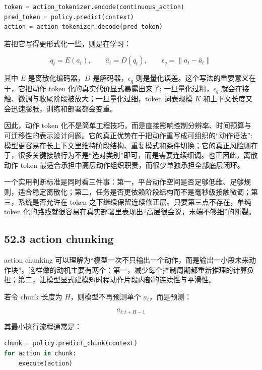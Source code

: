 \begin{lstlisting}[language=python]
token = action_tokenizer.encode(continuous_action)
pred_token = policy.predict(context)
action = action_tokenizer.decode(pred_token)
\end{lstlisting}

若把它写得更形式化一些，则是在学习：

\begingroup
\footnotesize
\begin{equation*}
q_t = E(a_t), \qquad \hat{a}_t = D(q_t), \qquad
\epsilon_q = \|a_t - \hat{a}_t\|
\end{equation*}
\endgroup

其中 \(E\) 是离散化编码器，\(D\) 是解码器，\(\epsilon_q\) 则是量化误差。这个写法的重要意义在于，它把动作 token 化的真实代价显式暴露出来了: 一旦量化过粗，\(\epsilon_q\) 就会在接触、微调与收尾阶段被放大；一旦量化过细，token 词表规模 \(K\) 和上下文长度又会迅速膨胀，训练和部署都会变重。

因此，动作 token 化不是简单工程技巧，而是直接影响控制分辨率、时间预算与可迁移性的表示设计问题。它的真正优势在于把动作重写成可组织的“动作语法”: 模型更容易在长上下文里维持阶段结构、重复模式和条件切换；它的真正风险则在于，很多关键接触行为不是“选对类别”即可，而是需要连续细调。也正因此，离散动作 token 最适合承担中高层动作组织职责，而很少单独承担全部底层闭环。

一个实用判断标准是同时看三件事：第一，平台动作空间是否足够低维、足够规则，适合稳定离散化；第二，任务是否更依赖阶段结构而不是毫秒级接触微调；第三，系统是否允许在 token 之下继续保留连续修正层。只要第三点不存在，单纯 token 化的路线就很容易在真实部署里表现出“高层很会说，末端不够细”的断裂。

\subsection*{52.3 action chunking}


action chunking 可以理解为“模型一次不只输出一个动作，而是输出一小段未来动作块”。这样做的动机主要有两个：第一，减少每个控制周期都重新推理的计算负担；第二，让模型显式建模短时程动作片段内部的连续性与平滑性。

若令 chunk 长度为 \(H\)，则模型不再预测单个 \(a_t\)，而是预测：

\begin{equation*}
a_{t:t+H-1}
\end{equation*}

其最小执行流程通常是：

\begin{lstlisting}[language=python]
chunk = policy.predict_chunk(context)
for action in chunk:
    execute(action)
\end{lstlisting}

